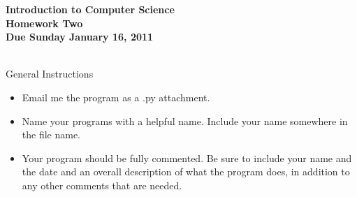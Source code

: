 \documentclass[12pt]{article}
\begin{document}
\pagestyle{empty}
 
\begin{center}
{\large {\bf Introduction to Computer Science}}\\
\medskip
{\large {\bf Homework Two}}\\
\medskip
{ {\bf Due Sunday January 16, 2011}}\\ 
\end{center}

\hspace{2mm}\\

\noindent General Instructions


\begin{itemize}
\setlength{\itemsep}{-1mm}
  \item Email me the program as a .py attachment.
  \item Name your programs with a helpful name.  Include your name
    somewhere in the file name.
  \item Your program should be fully commented.  Be sure to include
    your name and the date and an overall description of what the
    program does, in addition to any other comments that are needed. 
\end{itemize}
\end{document}
